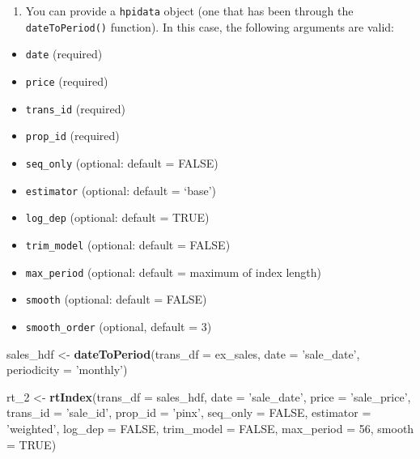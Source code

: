 \documentclass[]{article}
\newenvironment{Shaded}{\begin{snugshade}}{\end{snugshade}}
\newcommand{\KeywordTok}[1]{\textcolor[rgb]{0.13,0.29,0.53}{\textbf{#1}}}
\newcommand{\DataTypeTok}[1]{\textcolor[rgb]{0.13,0.29,0.53}{#1}}
\newcommand{\DecValTok}[1]{\textcolor[rgb]{0.00,0.00,0.81}{#1}}
\newcommand{\StringTok}[1]{\textcolor[rgb]{0.31,0.60,0.02}{#1}}
\newcommand{\OtherTok}[1]{\textcolor[rgb]{0.56,0.35,0.01}{#1}}
\newcommand{\NormalTok}[1]{#1}
\providecommand{\tightlist}{%
  \setlength{\itemsep}{0pt}\setlength{\parskip}{0pt}}
\begin{document}
\begin{enumerate}
\def\labelenumi{\arabic{enumi}.}
\setcounter{enumi}{1}
\tightlist
\item
  You can provide a \texttt{hpidata} object (one that has been through
  the \texttt{dateToPeriod()} function). In this case, the following
  arguments are valid:
\end{enumerate}

\begin{itemize}
\tightlist
\item
  \texttt{date} (required)
\item
  \texttt{price} (required)
\item
  \texttt{trans\_id} (required)
\item
  \texttt{prop\_id} (required)
\item
  \texttt{seq\_only} (optional: default = FALSE)
\item
  \texttt{estimator} (optional: default = `base')
\item
  \texttt{log\_dep} (optional: default = TRUE)
\item
  \texttt{trim\_model} (optional: default = FALSE)
\item
  \texttt{max\_period} (optional: default = maximum of index length)
\item
  \texttt{smooth} (optional: default = FALSE)
\item
  \texttt{smooth\_order} (optional, default = 3)
\end{itemize}

\begin{Shaded}
\begin{Highlighting}[]

\NormalTok{  sales_hdf <-}\StringTok{ }\KeywordTok{dateToPeriod}\NormalTok{(}\DataTypeTok{trans_df =}\NormalTok{ ex_sales,}
                            \DataTypeTok{date =} \StringTok{'sale_date'}\NormalTok{,}
                            \DataTypeTok{periodicity =} \StringTok{'monthly'}\NormalTok{)}
\end{Highlighting}
\end{Shaded}

\begin{Shaded}
\begin{Highlighting}[]
\NormalTok{  rt_}\DecValTok{2}\NormalTok{ <-}\StringTok{ }\KeywordTok{rtIndex}\NormalTok{(}\DataTypeTok{trans_df =}\NormalTok{ sales_hdf,}
                  \DataTypeTok{date =} \StringTok{'sale_date'}\NormalTok{,}
                  \DataTypeTok{price =} \StringTok{'sale_price'}\NormalTok{,}
                  \DataTypeTok{trans_id =} \StringTok{'sale_id'}\NormalTok{,}
                  \DataTypeTok{prop_id =} \StringTok{'pinx'}\NormalTok{,}
                  \DataTypeTok{seq_only =} \OtherTok{FALSE}\NormalTok{,}
                  \DataTypeTok{estimator =} \StringTok{'weighted'}\NormalTok{,}
                  \DataTypeTok{log_dep =} \OtherTok{FALSE}\NormalTok{,}
                  \DataTypeTok{trim_model =} \OtherTok{FALSE}\NormalTok{,}
                  \DataTypeTok{max_period =} \DecValTok{56}\NormalTok{,}
                  \DataTypeTok{smooth =} \OtherTok{TRUE}\NormalTok{)}
\end{Highlighting}
\end{Shaded}
\end{document}
